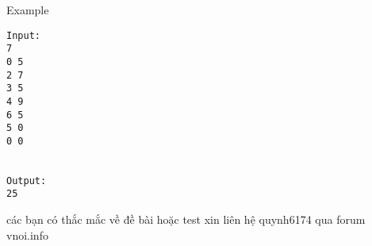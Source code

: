 Example
\begin{verbatim}
Input:
7
0 5
2 7
3 5
4 9
6 5
5 0
0 0


Output:
25
\end{verbatim}

các bạn có thắc mắc về đề bài hoặc test xin liên hệ quynh6174 qua forum vnoi.info